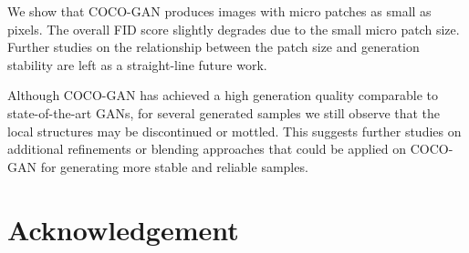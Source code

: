 \documentclass{article}
\newcommand{\modelName}{COCO-GAN }
\begin{document}
    We show that \modelName produces  images with micro patches as small as  pixels. The overall FID score slightly degrades due to the small micro patch size. Further studies on the relationship between the patch size and generation stability are left as a straight-line future work.
    
    Although \modelName has achieved a high generation quality comparable to state-of-the-art GANs, for several generated samples we still observe that the local structures may be discontinued or mottled. This suggests further studies on additional refinements or blending approaches that could be applied on \modelName for generating more stable and reliable samples.
    




    
     \section{Acknowledgement} 
\end{document}
